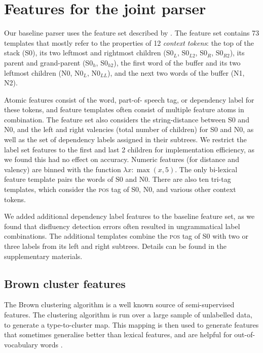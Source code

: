 \documentclass[11pt,letterpaper]{article}
\newcommand{\pos}{\textsc{pos}\xspace}
\newcommand{\szero}{S0\xspace}
\newcommand{\nzero}{N0\xspace}
\newcommand{\szeroH}{S0$_h$\xspace}
\newcommand{\szeroHH}{S0$_{h2}$\xspace}
\newcommand{\szeroL}{S0$_L$\xspace}
\newcommand{\szeroLL}{S0$_{L2}$\xspace}
\newcommand{\szeroR}{S0$_R$\xspace}
\newcommand{\szeroRR}{S0$_{R2}$\xspace}
\newcommand{\nzeroL}{N0$_L$\xspace}
\newcommand{\nzeroLL}{N0$_{LL}$\xspace}
\begin{document}
\section{Features for the joint parser}
\label{sec:features}

Our baseline parser uses the feature set described by \citet{zhang:11}.
The feature set contains 73 templates that mostly refer to the properties of
12 \emph{context tokens}: the top of the stack (\szero), its two leftmost and
rightmost children (\szeroL, \szeroLL, \szeroR, \szeroRR), its parent and
grand-parent (\szeroH, \szeroHH), the first word of the buffer and its two leftmost
children (\nzero, \nzeroL, \nzeroLL), and the next two words of the buffer (N1, N2).

Atomic features consist of the word, part-of- speech tag, or dependency label
for these tokens, and feature templates often consist of multiple feature atoms
in combination.  The feature set also considers the string-distance between \szero
and \nzero, and the left and right valencies
(total number of children) for \szero and \nzero, as well as the set of dependency
labels assigned in their subtrees. We restrict the label set features
to the first and last 2 children for implementation efficiency, as we found this
had no effect on accuracy. Numeric features (for distance and valency) are binned
with the function $\lambda x: \max(x, 5)$.
The only bi-lexical feature template pairs
the words of \szero and \nzero.
There are also ten tri-tag templates, which consider the
\pos tag of \szero, \nzero, and various other context tokens.

We added additional dependency label features to the baseline feature
set, as we found that disfluency detection errors often resulted in ungrammatical
label combinations.  The additional templates combine the \pos tag of \szero with
two or three labels from its left and right subtrees.  Details can be found in
the supplementary materials.

\subsection{Brown cluster features}

The Brown clustering algorithm \citep{brown:92} is a well known source
of semi-supervised features. The clustering algorithm is run over a large sample
of unlabelled data, to generate a type-to-cluster map. This mapping is then used
to generate features that sometimes generalise better than lexical features,
and are helpful for out-of-vocabulary words \citep{turian:10}.
\end{document}
